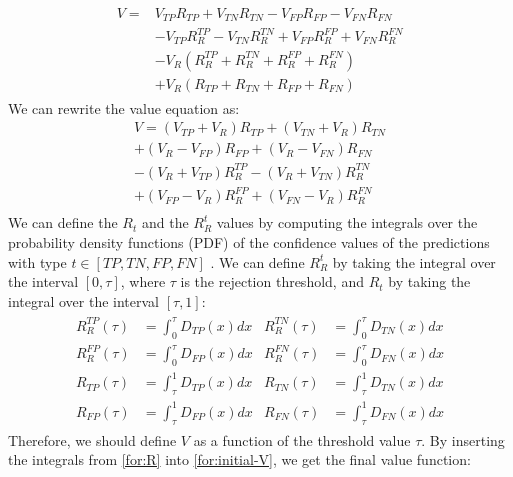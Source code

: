     \begin{align}
        \begin{split}
            V ={}& V_{TP}R_{TP} + V_{TN}R_{TN} - V_{FP}R_{FP} - V_{FN}R_{FN}\\
            & - V_{TP}R_R^{TP} - V_{TN}R_R^{TN} + V_{FP}R_R^{FP} + V_{FN}R_R^{FN}\\
            & - V_R(R_R^{TP} + R_R^{TN} + R_R^{FP} + R_R^{FN})\\
            & + V_R(R_{TP} + R_{TN} + R_{FP} + R_{FN})
        \end{split}
    \end{align}
\fi %
We can rewrite the value equation as:
\begin{multline}
    \label{for:initial-V}
    V = (V_{TP} + V_R)R_{TP} + (V_{TN} + V_R)R_{TN}\\
    + (V_R - V_{FP})R_{FP} +  (V_R - V_{FN})R_{FN}\\
    - (V_R + V_{TP})R_R^{TP} - (V_R + V_{TN})R_R^{TN}\\
    + (V_{FP} - V_R)R_R^{FP} + (V_{FN} - V_R)R_R^{FN}\\
\end{multline}
% 
We can define the $R_t$ and the $R_R^t$ values by computing the integrals over the probability density functions (PDF) of the confidence values of the predictions with type $t \in [TP, TN, FP, FN]$ \cite{de2000reject}. We can define $R^t_R$ by taking the integral over the interval $[0, \tau]$, where $\tau$ is the rejection threshold, and $R_t$ by taking the integral over the interval $[\tau, 1]$:
%
\begin{align}
    \label{for:R}
    \begin{aligned}
        R_R^{TP}(\tau) & = \int_0^\tau D_{TP}(x)dx & R_R^{TN}(\tau) & = \int_0^\tau D_{TN}(x)dx \\
        R_R^{FP}(\tau) & = \int_0^\tau D_{FP}(x)dx & R_R^{FN}(\tau) & = \int_0^\tau D_{FN}(x)dx \\
        R_{TP}(\tau)   & = \int_\tau^1 D_{TP}(x)dx & R_{TN}(\tau)   & = \int_\tau^1 D_{TN}(x)dx \\
        R_{FP}(\tau)   & = \int_\tau^1 D_{FP}(x)dx & R_{FN}(\tau)   & = \int_\tau^1 D_{FN}(x)dx
    \end{aligned}
\end{align}
%
Therefore, we should define $V$ as a function of the threshold value $\tau$. By inserting the integrals from \ref{for:R} into \ref{for:initial-V}, we get the final value function:
%
